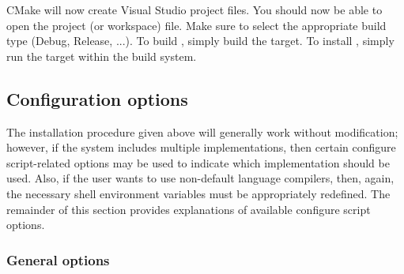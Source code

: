 CMake will now create Visual Studio project files. You should now be able to 
open the {\sundials} project (or workspace) file. Make sure to select the appropriate 
build type (Debug, Release, ...). To build {\sundials}, simply build the 
target. To install {\sundials}, simply run the  target within the build system.



\subsection{Configuration options}\label{ss:configuration_options}

The installation procedure given above will generally work without modification;
however, if the system includes multiple {\mpi} implementations, then certain
configure script-related options may be used to indicate which {\mpi}
implementation should be used. Also, if the user wants to use non-default
language compilers, then, again, the necessary shell environment variables must
be appropriately redefined.
The remainder of this section provides explanations of available configure script
options.


\subsubsection*{General options}


